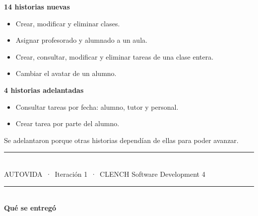 \documentclass[11pt]{article}
\newcommand{\titulo}[1]{%
  {\color{cian}\rule{2.2cm}{2.2pt}}\\[0.30cm]
  {\fontsize{21}{24}\selectfont\bfseries\color{tinta} #1}\\[0.45cm]}
\newcommand{\pie}[1]{%
  \vfill
  {\color{linea}\rule{\textwidth}{0.4pt}}\\[0.12cm]
  {\footnotesize\color{grisclaro} AUTOVIDA\, ·\, Iteración 1\, ·\, CLENCH Software Development
   \hfill #1}}
\begin{document}
\begin{minipage}[t]{0.47\textwidth}
\vspace{0pt}
{\color{cianoscuro}\textbf{14 historias nuevas}}\\[0.25cm]
{\small
\begin{itemize}[itemsep=3pt]
  \item Crear, modificar y eliminar clases.
  \item Asignar profesorado y alumnado a un aula.
  \item Crear, consultar, modificar y eliminar tareas de una clase entera.
  \item Cambiar el avatar de un alumno.
\end{itemize}}
\end{minipage}%
\hfill
\begin{minipage}[t]{0.47\textwidth}
\vspace{0pt}
{\color{cianoscuro}\textbf{4 historias adelantadas}}\\[0.25cm]
{\small
\begin{itemize}[itemsep=3pt]
  \item Consultar tareas por fecha: alumno, tutor y personal.
  \item Crear tarea por parte del alumno.
\end{itemize}

\vspace{0.3cm}
{\color{gris} Se adelantaron porque otras historias dependían de ellas para poder avanzar.}}
\end{minipage}

\pie{4}
\newpage

\pagecolor{white}
\titulo{Qué se entregó}
\vfill
\end{document}
